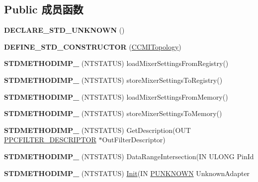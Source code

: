 \subsection*{Public 成员函数}
\begin{DoxyCompactItemize}
\item 
\mbox{\label{class_c_c_m_i_topology_ab1c39b2fc8942e546b3cde39f0caf1da}} 
{\bfseries D\+E\+C\+L\+A\+R\+E\+\_\+\+S\+T\+D\+\_\+\+U\+N\+K\+N\+O\+WN} ()
\item 
\mbox{\label{class_c_c_m_i_topology_ad1cdd6564a057e5ea059a55b39ef6572}} 
{\bfseries D\+E\+F\+I\+N\+E\+\_\+\+S\+T\+D\+\_\+\+C\+O\+N\+S\+T\+R\+U\+C\+T\+OR} (\hyperlink{class_c_c_m_i_topology}{C\+C\+M\+I\+Topology})
\item 
\mbox{\label{class_c_c_m_i_topology_ad3162a48dcb1ca9cf6e52d11aba2aee7}} 
{\bfseries S\+T\+D\+M\+E\+T\+H\+O\+D\+I\+M\+P\+\_\+} (N\+T\+S\+T\+A\+T\+US) load\+Mixer\+Settings\+From\+Registry()
\item 
\mbox{\label{class_c_c_m_i_topology_a9e8e5327115583e1a5a8ffb56609eb33}} 
{\bfseries S\+T\+D\+M\+E\+T\+H\+O\+D\+I\+M\+P\+\_\+} (N\+T\+S\+T\+A\+T\+US) store\+Mixer\+Settings\+To\+Registry()
\item 
\mbox{\label{class_c_c_m_i_topology_ab85fdeccc7581ef40fed05852c1c309e}} 
{\bfseries S\+T\+D\+M\+E\+T\+H\+O\+D\+I\+M\+P\+\_\+} (N\+T\+S\+T\+A\+T\+US) load\+Mixer\+Settings\+From\+Memory()
\item 
\mbox{\label{class_c_c_m_i_topology_ab29a9f7aa4fa4604a7111c70d8b45f42}} 
{\bfseries S\+T\+D\+M\+E\+T\+H\+O\+D\+I\+M\+P\+\_\+} (N\+T\+S\+T\+A\+T\+US) store\+Mixer\+Settings\+To\+Memory()
\item 
\mbox{\label{class_c_c_m_i_topology_abe06f2f248ddecda9b916134c84833fa}} 
{\bfseries S\+T\+D\+M\+E\+T\+H\+O\+D\+I\+M\+P\+\_\+} (N\+T\+S\+T\+A\+T\+US) Get\+Description(O\+UT \hyperlink{struct_p_c_f_i_l_t_e_r___d_e_s_c_r_i_p_t_o_r}{P\+P\+C\+F\+I\+L\+T\+E\+R\+\_\+\+D\+E\+S\+C\+R\+I\+P\+T\+OR} $\ast$Out\+Filter\+Descriptor)
\item 
\mbox{\label{class_c_c_m_i_topology_a4528ea5ca72bd0ba4566d013cb64810d}} 
{\bfseries S\+T\+D\+M\+E\+T\+H\+O\+D\+I\+M\+P\+\_\+} (N\+T\+S\+T\+A\+T\+US) Data\+Range\+Intersection(IN U\+L\+O\+NG Pin\+Id
\item 
\mbox{\label{class_c_c_m_i_topology_aba5c87b805bbb5d9573cb5589f892b80}} 
{\bfseries S\+T\+D\+M\+E\+T\+H\+O\+D\+I\+M\+P\+\_\+} (N\+T\+S\+T\+A\+T\+US) \hyperlink{class_init}{Init}(IN \hyperlink{interface_i_unknown}{P\+U\+N\+K\+N\+O\+WN} Unknown\+Adapter
\end{DoxyCompactItemize}
